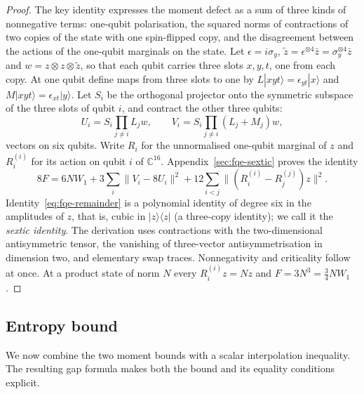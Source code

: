 \begin{proof} The key identity expresses the moment defect as a sum of three kinds of nonnegative terms: one-qubit
polarisation, the squared norms of contractions of two copies of the state with one spin-flipped copy, and the
disagreement between the actions of the one-qubit marginals on the state. Let \(\epsilon=i\sigma_y\), \(\tilde z=\epsilon^{\otimes4}\bar z=\sigma_y^{\otimes4}\bar z\) and
\(w=z\otimes z\otimes\tilde z\), so that each qubit carries three slots \(x,y,t\), one from each copy. At one qubit define
maps from three slots to one by \(L|xyt\rangle=\epsilon_{yt}|x\rangle\) and \(M|xyt\rangle=\epsilon_{xt}|y\rangle\). Let
\(S_i\) be the orthogonal projector onto the symmetric subspace of the three slots of qubit \(i\), and contract the other
three qubits:
\[
U_i=S_i\!\prod_{j\ne i}L_jw,\qquad V_i=S_i\!\prod_{j\ne i}(L_j+M_j)w,
\]
vectors on six qubits. Write \(R_i\) for the unnormalised one-qubit marginal of \(z\) and \(R_i^{(i)}\) for its action on
qubit \(i\) of \(\mathbb C^{16}\). Appendix~\ref{sec:fqe-sextic} proves the identity \[
\boxed{\quad8F=6NW_1+3\sum_i\|V_i-8U_i\|^2+12\sum_{i<j}\bigl\|(R_i^{(i)}-R_j^{(j)})z\bigr\|^2.\quad}
\tag{S}\label{eq:fqe-remainder}
\] Identity~\eqref{eq:fqe-remainder} is a polynomial identity of degree six in the amplitudes of $z$, that is, cubic in
$|z\rangle\langle z|$ (a three-copy identity); we call it the \emph{sextic identity}.
The derivation uses contractions with the two-dimensional antisymmetric tensor, the vanishing of three-vector
antisymmetrisation in dimension two, and elementary swap traces. Nonnegativity and criticality follow at once. At a
product state of norm \(N\) every \(R_i^{(i)}z=Nz\) and \(F=3N^3=\tfrac34NW_1\). \end{proof}

\subsection{Entropy bound}\label{sec:fqe-entropy_maximum-entropy-bound}

We now combine the two moment bounds with a scalar interpolation inequality.
The resulting gap formula makes both the bound and its equality conditions explicit.

